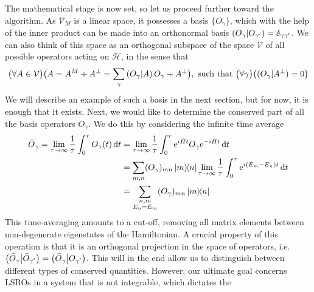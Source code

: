 The mathematical stage is now set, so let us proceed further toward the algorithm.
As \(\mathcal{V}_M\) is a linear space, it possesses a basis \(\{O_{\gamma}\}\),
which with the help of the inner product can be made into an orthonormal basis \(\left(O_{\gamma} \middle| O_{\gamma^{\prime}}\right) = \delta_{\gamma\gamma^{\prime}}\).
We can also think of this space as an orthogonal subspace of the space \(\mathcal{V}\) of all possible operators
acting on \(\mathcal{H}\), in the sense that
\begin{equation}
  \big(\forall A \in \mathcal{V} \big) \big( A = A^M + A^{\perp} = \sum_{\gamma} \left(O_{\gamma} \middle| A\right) O_{\gamma} + A^{\perp}\big) ,
  \text{ such that } \big(\forall \gamma\big) \big( ({O_{\gamma}}|{A^{\perp}}) = 0\big)
  \label{eq:decomposition}
\end{equation}
We will describe an example of such a basis in the next section, but for now, it is enough that it exists.
Next, we would like to determine the conserved part of all the basis operators \(O_{\gamma}\). We do this
by considering the infinite time average
\begin{align}
  \bar{O}_{\gamma} = \lim_{\tau\to\infty}\frac{1}{\tau} \int_0^{\tau} O_{\gamma}(t) \dd{t} & =
  \lim_{\tau\to\infty}\frac{1}{\tau} \int_0^{\tau} \mathrm{e}^{i \hat{H}  t}O_{\gamma} \mathrm{e}^{-i \hat{H}  t} \dd{t} \nonumber                                                                                                   \\
                                                                                           & = \sum_{m,n} (O_{\gamma})_{mn}\ketbra{m}{n} \lim_{\tau\to\infty} \frac{1}{\tau} \int_0^{\tau} \mathrm{e}^{i(E_m-E_n)t} \dd{t} \nonumber \\
                                                                                           & = \sum_{\substack{n,m                                                                                                                   \\ E_n = E_m}} (O_{\gamma})_{mn}\ketbra{m}{n}
  \label{eq:time_avg}
\end{align}
This time-averaging amounts to a cut-off, removing all matrix elements between non-degenerate eigenstates
of the Hamiltonian. A crucial property of this operation is that it is an orthogonal projection
in the space of operators, i.e. \(\left(\bar{O}_{\gamma} \middle| \bar{O}_{\gamma^{\prime}}\right) = \left(\bar{O}_{\gamma} \middle| O_{\gamma^{\prime}}\right)\). This will
in the end allow us to distinguish between different types of conserved quantities.
However, our ultimate goal concerns LSROs in a system that is not integrable, which dictates the

